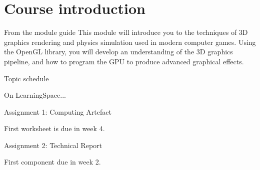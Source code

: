 \part{Course introduction}
\frame{\partpage}

\begin{frame}{From the module guide}
This module will introduce you to the techniques of 3D graphics rendering and physics simulation used in modern computer games. Using the OpenGL library, you will develop an understanding of the 3D graphics pipeline, and how to program the GPU to produce advanced graphical effects.
\end{frame}

\begin{frame}{Topic schedule}
	\begin{center}
		On LearningSpace...
	\end{center}
\end{frame}

\begin{frame}{Assignment 1: Computing Artefact}
	\begin{center}
		First worksheet is due in week 4.
	\end{center}
\end{frame}

\begin{frame}{Assignment 2: Technical Report}
	\begin{center}
		First component due in week 2.
	\end{center}
\end{frame}
